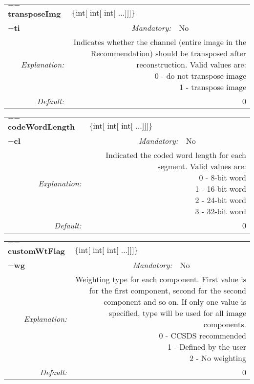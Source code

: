 \begin{center}\begin{tabular}{|rr|rlrl|}
\hline
\multicolumn{2}{|l|}{\textbf{$-$$-$transposeImg}} & \multicolumn{4}{|l|}{$\{$int$[$ int$[$ int$[$ ...$]$$]$$]$$\}$} \\
\cline{3-6}
\multicolumn{2}{|l|}{\textbf{$-$ti}} & \emph{Mandatory:} & No & &  \\
\hline
\emph{Explanation:} & \multicolumn{5}{|p{12cm}|}{Indicates whether the channel (entire image in the Recommendation) should be transposed after reconstruction. Valid values are:\newline 0 - do not transpose image \newline 1 - transpose image} \\
\hline
\emph{Default:} & \multicolumn{5}{|p{12cm}|}{0 } \\
\hline
\end{tabular}\end{center}
\begin{center}\begin{tabular}{|rr|rlrl|}
\hline
\multicolumn{2}{|l|}{\textbf{$-$$-$codeWordLength}} & \multicolumn{4}{|l|}{$\{$int$[$ int$[$ int$[$ ...$]$$]$$]$$\}$} \\
\cline{3-6}
\multicolumn{2}{|l|}{\textbf{$-$cl}} & \emph{Mandatory:} & No & &  \\
\hline
\emph{Explanation:} & \multicolumn{5}{|p{12cm}|}{Indicated the coded word length for each segment. Valid values are:\newline 0 - 8-bit word \newline 1 - 16-bit word \newline 2 - 24-bit word \newline 3 - 32-bit word} \\
\hline
\emph{Default:} & \multicolumn{5}{|p{12cm}|}{0 } \\
\hline
\end{tabular}\end{center}
\begin{center}\begin{tabular}{|rr|rlrl|}
\hline
\multicolumn{2}{|l|}{\textbf{$-$$-$customWtFlag}} & \multicolumn{4}{|l|}{$\{$int$[$ int$[$ int$[$ ...$]$$]$$]$$\}$} \\
\cline{3-6}
\multicolumn{2}{|l|}{\textbf{$-$wg}} & \emph{Mandatory:} & No & &  \\
\hline
\emph{Explanation:} & \multicolumn{5}{|p{12cm}|}{Weighting type for each component. First value is for the first component, second for the second component and so on. If only one value is specified, type will be used for all image components.\newline 0 - CCSDS recommended\newline 1 - Defined by the user\newline 2 - No weighting} \\
\hline
\emph{Default:} & \multicolumn{5}{|p{12cm}|}{0 } \\
\hline
\end{tabular}\end{center}

